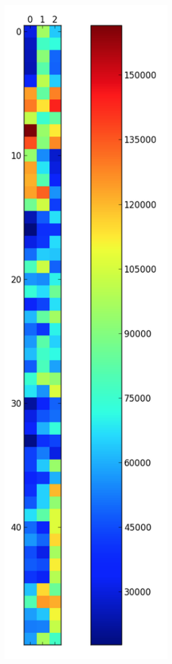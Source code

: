 \documentclass[a4paper, oneside]{csthesis}
\begin{document}
\begin{figure}
    \centering

    \begin{subfigure}[b]{0.3\textwidth}
            \centering
            \includegraphics[width=0.8\textwidth]{figures/dtw_forgeries_1.png}

\end{subfigure}
\end{figure}
\end{document}
